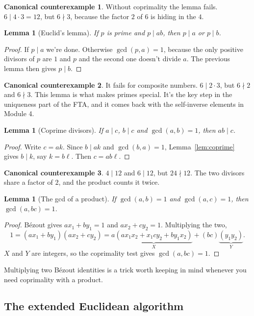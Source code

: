 \documentclass[11pt,a4paper]{article}
\newtheorem{lemma}[theorem]{Lemma}
\theoremstyle{definition}
\theoremstyle{noteit}
\theoremstyle{note}
\newtheorem*{counter}{Canonical counterexample}
\begin{document}
\begin{counter}
Without coprimality the lemma fails. $6\mid 4\cdot 3=12$, but $6\nmid 3$, because the factor $2$ of $6$ is hiding in the $4$.
\end{counter}

\begin{lemma}[Euclid's lemma]
If $p$ is prime and $p\mid ab$, then $p\mid a$ or $p\mid b$.
\end{lemma}
\begin{proof}
If $p\mid a$ we're done. Otherwise $\gcd(p,a)=1$, because the only positive divisors of $p$ are $1$ and $p$ and the second one doesn't divide $a$. The previous lemma then gives $p\mid b$.
\end{proof}

\begin{counter}
It fails for composite numbers. $6\mid 2\cdot 3$, but $6\nmid2$ and $6\nmid3$. This lemma is what makes primes special. It's the key step in the uniqueness part of the FTA, and it comes back with the self-inverse elements in Module 4.
\end{counter}

\begin{lemma}[Coprime divisors]
If $a\mid c$, $b\mid c$ and $\gcd(a,b)=1$, then $ab\mid c$.
\end{lemma}
\begin{proof}
Write $c=ak$. Since $b\mid ak$ and $\gcd(b,a)=1$, Lemma~\ref{lem:coprime} gives $b\mid k$, say $k=b\ell$. Then $c=ab\ell$.
\end{proof}
\begin{counter}
$4\mid 12$ and $6\mid 12$, but $24\nmid 12$. The two divisors share a factor of $2$, and the product counts it twice.
\end{counter}

\begin{lemma}[The gcd of a product]
If $\gcd(a,b)=1$ and $\gcd(a,c)=1$, then $\gcd(a,bc)=1$.
\end{lemma}
\begin{proof}
Bézout gives $ax_1+by_1=1$ and $ax_2+cy_2=1$. Multiplying the two,
\[
1=(ax_1+by_1)(ax_2+cy_2)=a\underbrace{(ax_1x_2+x_1cy_2+by_1x_2)}_{X}+(bc)\underbrace{(y_1y_2)}_{Y}.
\]
$X$ and $Y$ are integers, so the coprimality test gives $\gcd(a,bc)=1$.
\end{proof}
Multiplying two Bézout identities is a trick worth keeping in mind whenever you need coprimality with a product.

\subsection{The extended Euclidean algorithm}
\end{document}
